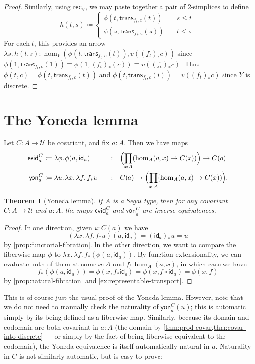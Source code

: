 \documentclass[12pt]{amsart}
\theoremstyle{plain}
\newtheorem{thm}{Theorem}[section]
\theoremstyle{definition}
\theoremstyle{remark}
\numberwithin{equation}{section}
\newcommand{\jdeq}{\equiv}
\newcommand{\defeq}{\coloneqq}
\newcommand{\univtype}{\mathcal{U}}
\newcommand{\rec}{\mathsf{rec}}
\newcommand{\evid}{\mathsf{evid}}
\newcommand{\yon}{\mathsf{yon}}
\newcommand{\lam}[1]{\lambda #1.\,}
\newcommand{\idarr}[1]{\mathsf{id}_{#1}}
\newcommand{\covtr}[1]{{#1}_*}  %
\newcommand{\istrans}[2]{\mathsf{trans}_{#1,#2}}
\newcommand{\Parens}[1]{\Bigl(#1\Bigr)}
\begin{document}
\begin{proof}
Similarly, using $\rec_\lor$, we may paste  together a pair of 2-simplices to define
  \[
  h(t,s) \defeq
  \begin{cases}
    \phi(t,\istrans{f_t}{c}(t)) &\quad s \le t \\
    \phi(s,\istrans{f_t}{c}(s)) &\quad t \le s.
  \end{cases}
  \]
For each $t$, this provides an arrow $\lam{s} h(t,s) : \hom_Y( \phi(t,\istrans{f_t}{c}(t)) , v((f_t)_*c))$ since $    \phi(1,\istrans{f_t}{c}(1)) \jdeq \phi(1, (f_t)_*(c)) \jdeq v((f_t)_*c)$. Thus $\phi(t,c) =  \phi(t,\istrans{f_t}{c}(t))$ and $ \phi(t,\istrans{f_t}{c}(t)) =  v((f_t)_*c)$ since $Y$ is discrete.
\end{proof}


\section{The Yoneda lemma}
\label{sec:yoneda-lemma}

Let $C:A\to \univtype$ be covariant, and fix $a:A$.
Then we have maps
\begin{alignat*}{2}
  \evid^C_a &\defeq \lam{\phi}\phi(a,\idarr a) &\quad:\quad& \Parens{\prod_{x:A} (\hom_A(a,x) \to C(x))} \to C(a)\\
  \yon^C_a &\defeq \lam{u} \lam{x}\lam{f} \covtr f u &\quad:\quad& C(a) \to \Parens{\prod_{x:A} (\hom_A(a,x) \to C(x))}.
\end{alignat*}

\begin{thm}[Yoneda lemma]\label{thm:yoneda}
  If $A$ is a Segal type, then for any covariant $C:A\to \univtype$ and $a : A$, the maps $\evid^C_a$ and $\yon^C_a$ are inverse equivalences.
\end{thm}
\begin{proof}
In one direction, given $u : C(a)$ we have
\[ (\lam{x}\lam{f} \covtr f u)(a,\idarr a) = \covtr {(\idarr a)}u = u\] by \cref{prop:functorial-fibration}. 
In the other direction, we want to compare the fiberwise map $\phi$ to $\lam{x}\lam{f} \covtr f (\phi(a,\idarr a))$.
By function extensionality, we can evaluate both of them at some $x:A$ and $f:\hom_A(a,x)$, in which case we have
\[ \covtr f (\phi(a,\idarr a)) = \phi(x,\covtr f \idarr a) = \phi(x,f \circ \idarr a) = \phi(x,f) \]
by \cref{prop:natural-fibration} and \cref{ex:representable-transport}.
\end{proof}

This is of course just the usual proof of the Yoneda lemma.
However, note that we do not need to manually check the naturality of $\yon_a^C(u)$; this is automatic simply by its being defined as a fiberwise map.
Similarly, because its domain and codomain are both covariant in $a:A$ (the domain by \cref{thm:prod-covar,thm:covar-into-discrete} --- or simply by the fact of being fiberwise equivalent to the codomain), the Yoneda equivalence is itself automatically natural in $a$.
Naturality in $C$ is not similarly automatic, but is easy to prove:
\end{document}
